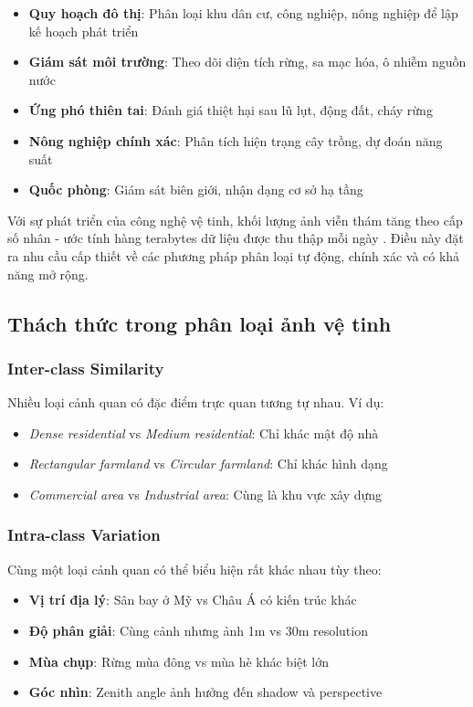 \documentclass[12pt,a4paper]{article}
\begin{document}
\begin{itemize}[noitemsep]
    \item \textbf{Quy hoạch đô thị}: Phân loại khu dân cư, công nghiệp, nông nghiệp để lập kế hoạch phát triển
    \item \textbf{Giám sát môi trường}: Theo dõi diện tích rừng, sa mạc hóa, ô nhiễm nguồn nước
    \item \textbf{Ứng phó thiên tai}: Đánh giá thiệt hại sau lũ lụt, động đất, cháy rừng
    \item \textbf{Nông nghiệp chính xác}: Phân tích hiện trạng cây trồng, dự đoán năng suất
    \item \textbf{Quốc phòng}: Giám sát biên giới, nhận dạng cơ sở hạ tầng
\end{itemize}

Với sự phát triển của công nghệ vệ tinh, khối lượng ảnh viễn thám tăng theo cấp số nhân - ước tính hàng terabytes dữ liệu được thu thập mỗi ngày \cite{chi2016big}. Điều này đặt ra nhu cầu cấp thiết về các phương pháp phân loại tự động, chính xác và có khả năng mở rộng.

\subsection{Thách thức trong phân loại ảnh vệ tinh}

\subsubsection{Inter-class Similarity}

Nhiều loại cảnh quan có đặc điểm trực quan tương tự nhau. Ví dụ:
\begin{itemize}
    \item \textit{Dense residential} vs \textit{Medium residential}: Chỉ khác mật độ nhà
    \item \textit{Rectangular farmland} vs \textit{Circular farmland}: Chỉ khác hình dạng
    \item \textit{Commercial area} vs \textit{Industrial area}: Cùng là khu vực xây dựng
\end{itemize}

\subsubsection{Intra-class Variation}

Cùng một loại cảnh quan có thể biểu hiện rất khác nhau tùy theo:
\begin{itemize}
    \item \textbf{Vị trí địa lý}: Sân bay ở Mỹ vs Châu Á có kiến trúc khác
    \item \textbf{Độ phân giải}: Cùng cảnh nhưng ảnh 1m vs 30m resolution
    \item \textbf{Mùa chụp}: Rừng mùa đông vs mùa hè khác biệt lớn
    \item \textbf{Góc nhìn}: Zenith angle ảnh hưởng đến shadow và perspective
\end{itemize}
\end{document}
